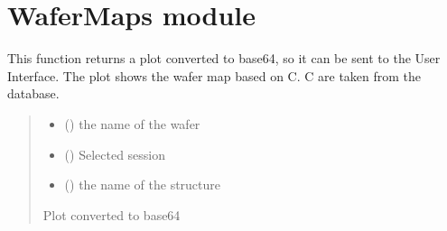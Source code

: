 \documentclass[letterpaper,10pt,english]{sphinxmanual}
\begin{document}
\sphinxstepscope


\chapter{WaferMaps module}
\label{\detokenize{WaferMaps:module-WaferMaps}}\label{\detokenize{WaferMaps:wafermaps-module}}\label{\detokenize{WaferMaps::doc}}

\begin{fulllineitems}
\label{\detokenize{WaferMaps:WaferMaps.C_wafer_map}}
\pysigstartsignatures
{}
\pysigstopsignatures
\sphinxAtStartPar
This function returns a plot converted to base64, so it can be sent to the User Interface. The plot shows the wafer map based on C.
C are taken from the database.
\begin{quote}\begin{description}
\begin{itemize}
\item {} 
\sphinxAtStartPar
{} () \textendash{} the name of the wafer

\item {} 
\sphinxAtStartPar
{} () \textendash{} Selected session

\item {} 
\sphinxAtStartPar
{} () \textendash{} the name of the structure

\end{itemize}

\sphinxAtStartPar
Plot converted to base64

\end{description}\end{quote}

\end{fulllineitems}
\end{document}
